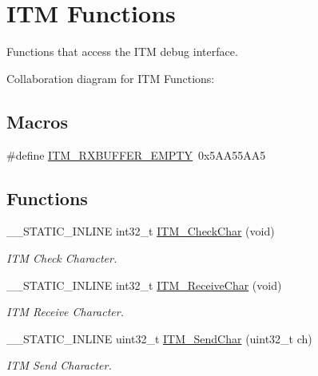 \hypertarget{group__CMSIS__core__DebugFunctions}{}\section{I\+TM Functions}
\label{group__CMSIS__core__DebugFunctions}


Functions that access the I\+TM debug interface.  


Collaboration diagram for I\+TM Functions\+:
\subsection*{Macros}
\begin{DoxyCompactItemize}
\item 
\#define \hyperlink{group__CMSIS__core__DebugFunctions_gaa822cb398ee022b59e9e6c5d7bbb228a}{I\+T\+M\+\_\+\+R\+X\+B\+U\+F\+F\+E\+R\+\_\+\+E\+M\+P\+TY}~0x5\+A\+A55\+A\+A5
\end{DoxyCompactItemize}
\subsection*{Functions}
\begin{DoxyCompactItemize}
\item 
\+\_\+\+\_\+\+S\+T\+A\+T\+I\+C\+\_\+\+I\+N\+L\+I\+NE int32\+\_\+t \hyperlink{group__CMSIS__core__DebugFunctions_gae61ce9ca5917735325cd93b0fb21dd29}{I\+T\+M\+\_\+\+Check\+Char} (void)
\begin{DoxyCompactList}\small\item\em I\+TM Check Character. \end{DoxyCompactList}\item 
\+\_\+\+\_\+\+S\+T\+A\+T\+I\+C\+\_\+\+I\+N\+L\+I\+NE int32\+\_\+t \hyperlink{group__CMSIS__core__DebugFunctions_gac3ee2c30a1ac4ed34c8a866a17decd53}{I\+T\+M\+\_\+\+Receive\+Char} (void)
\begin{DoxyCompactList}\small\item\em I\+TM Receive Character. \end{DoxyCompactList}\item 
\+\_\+\+\_\+\+S\+T\+A\+T\+I\+C\+\_\+\+I\+N\+L\+I\+NE uint32\+\_\+t \hyperlink{group__CMSIS__core__DebugFunctions_gac90a497bd64286b84552c2c553d3419e}{I\+T\+M\+\_\+\+Send\+Char} (uint32\+\_\+t ch)
\begin{DoxyCompactList}\small\item\em I\+TM Send Character. \end{DoxyCompactList}\end{DoxyCompactItemize}
